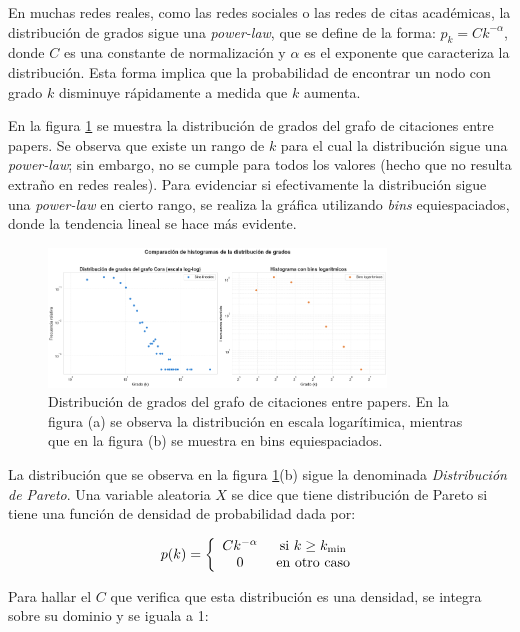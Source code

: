 \documentclass{article}
\begin{document}
En muchas redes reales, como las redes sociales o las redes de citas académicas, la distribución de grados sigue una \textit{power-law}, que se define de la forma: $p_k = Ck^{-\alpha}$, donde $C$ es una constante de normalización y $\alpha$ es el exponente que caracteriza la distribución. Esta forma implica que la probabilidad de encontrar un nodo con grado $k$ disminuye rápidamente a medida que $k$ aumenta.


En la figura \ref{fig: degree_distribution} se muestra la distribución de grados del grafo de citaciones entre papers. Se observa que existe un rango de $k$ para el cual la distribución sigue una \textit{power-law}; sin embargo, no se cumple para todos los valores (hecho que no resulta extraño en redes reales). Para evidenciar si efectivamente la distribución sigue una \textit{power-law} en cierto rango, se realiza la gráfica utilizando \textit{bins} equiespaciados, donde la tendencia lineal se hace más evidente.

\begin{figure}
    \centering
    \includegraphics[width=0.8\textwidth]{imagenes/dist_grado_Cora.png}
    \caption{Distribución de grados del grafo de citaciones entre papers. En la figura (a) se observa la distribución en escala logarítimica, mientras que en la figura (b) se muestra en bins equiespaciados.}
    \label{fig: degree_distribution}
\end{figure}


La distribución que se observa en la figura \ref{fig: degree_distribution}(b) sigue la denominada \textit{Distribución de Pareto}. Una variable aleatoria $X$ se dice que tiene distribución de Pareto si tiene una función de densidad de probabilidad dada por:

$$p(k) = \left\lbrace \begin{array}{c c} C k^{-\alpha} & \text{ si } k\geq k_\text{min} \\ 0 & \text{ en otro caso} \end{array}\right.$$


Para hallar el $C$ que verifica que esta distribución es una densidad, se integra sobre su dominio y se iguala a 1:
\end{document}
